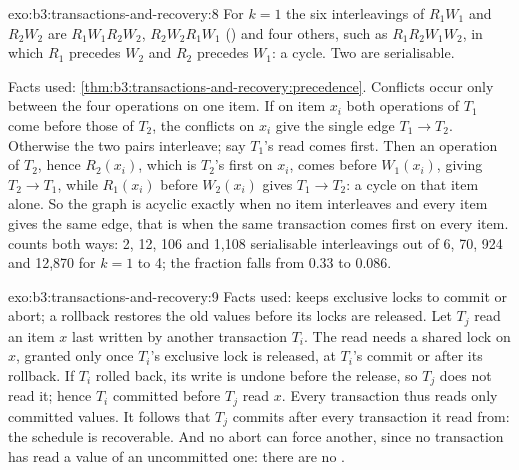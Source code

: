 \begin{solution}{exo:b3:transactions-and-recovery:8}
For $k = 1$ the six interleavings of $R_1 W_1$ and $R_2 W_2$ are $R_1 W_1 R_2 W_2$, $R_2 W_2 R_1 W_1$ () and four others, such as $R_1 R_2 W_1 W_2$, in which $R_1$ precedes $W_2$ and $R_2$ precedes $W_1$: a cycle. Two are serialisable.

Facts used: \cref{thm:b3:transactions-and-recovery:precedence}. Conflicts occur only between the four operations on one item. If on item $x_i$ both operations of $T_1$ come before those of $T_2$, the conflicts on $x_i$ give the single edge $T_1 \to T_2$. Otherwise the two pairs interleave; say $T_1$'s read comes first. Then an operation of $T_2$, hence $R_2(x_i)$, which is $T_2$'s first on $x_i$, comes before $W_1(x_i)$, giving $T_2 \to T_1$, while $R_1(x_i)$ before $W_2(x_i)$ gives $T_1 \to T_2$: a cycle on that item alone. So the graph is acyclic exactly when no item interleaves and every item gives the same edge, that is when the same transaction comes first on every item.  counts both ways: 2, 12, 106 and 1,108 serialisable interleavings out of 6, 70, 924 and 12,870 for $k = 1$ to 4; the fraction falls from 0.33 to 0.086.
\end{solution}

\begin{solution}{exo:b3:transactions-and-recovery:9}
Facts used:  keeps exclusive locks to commit or abort; a rollback restores the old values before its locks are released. Let $T_j$ read an item $x$ last written by another transaction $T_i$. The read needs a shared lock on $x$, granted only once $T_i$'s exclusive lock is released, at $T_i$'s commit or after its rollback. If $T_i$ rolled back, its write is undone before the release, so $T_j$ does not read it; hence $T_i$ committed before $T_j$ read $x$. Every transaction thus reads only committed values. It follows that $T_j$ commits after every transaction it read from: the schedule is recoverable. And no abort can force another, since no transaction has read a value of an uncommitted one: there are no .
\end{solution}


